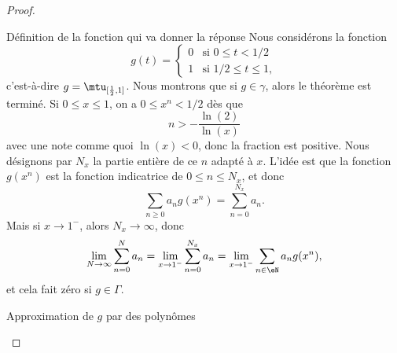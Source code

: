 \begin{proof}
\begin{subproof}
    \item[Définition de la fonction qui va donner la réponse]
        Nous considérons la fonction 
        \begin{equation}
            g(t)=\begin{cases}
                0    &   \text{si } 0\leq t<1/2\\
                1    &    \text{si } 1/2\leq t\leq 1,
            \end{cases}
        \end{equation}
        c'est-à-dire \( g=\mtu_{\mathopen[ \frac{ 1 }{2} , 1 \mathclose]}\). Nous montrons que si \( g\in \gamma\), alors le théorème est terminé. Si \( 0\leq x\leq 1\), on a \( 0\leq x^n<1/2\) dès que
        \begin{equation}
            n>-\frac{ \ln(2) }{ \ln(x) }
        \end{equation}
        avec une note comme quoi \( \ln(x)<0\), donc la fraction est positive. Nous désignons par \( N_x\) la partie entière de ce \( n\) adapté à \( x\). L'idée est que la fonction  \( g(x^n)\) est la fonction indicatrice de \(0 \leq n\leq N_x\), et donc
        \begin{equation}
            \sum_{n\geq 0}a_ng(x^n)=\sum_{n=0}^{N_x}a_n.
        \end{equation}
        Mais si \( x\to 1^-\), alors \( N_x\to \infty\), donc
        \begin{equation}
            \lim_{N\to \infty} \sum_{n=0}^Na_n=\lim_{x\to 1^-} \sum_{n=0}^{N_x}a_n=\lim_{x\to 1^-} \sum_{n\in \eN}a_ng(x^n),
        \end{equation}
        et cela fait zéro si \( g\in \Gamma\).

    \item[Approximation de \( g\) par des polynômes]


\end{subproof}
\end{proof}
